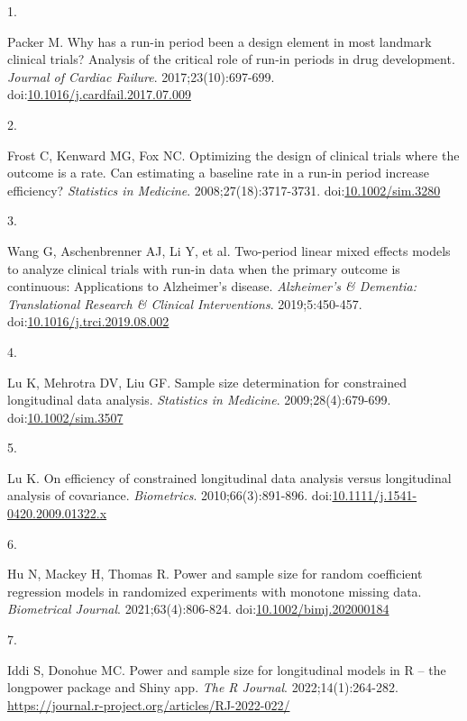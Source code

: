 \documentclass[
  11pt,
]{article}
\newlength{\cslhangindent}
\newlength{\csllabelwidth}
\newenvironment{CSLReferences}[2] %
 {\begin{list}{}{%
  \setlength{\itemindent}{0pt}
  \setlength{\leftmargin}{0pt}
  \setlength{\parsep}{0pt}
  \ifodd #1
   \setlength{\leftmargin}{\cslhangindent}
   \setlength{\itemindent}{-1\cslhangindent}
  \fi
  \setlength{\itemsep}{#2\baselineskip}}}
 {\end{list}}
\newcommand{\CSLLeftMargin}[1]{\parbox[t]{\csllabelwidth}{\strut#1\strut}}
\newcommand{\CSLRightInline}[1]{\parbox[t]{\linewidth - \csllabelwidth}{\strut#1\strut}}
\begin{document}
\protect{}\label{refs}
\begin{CSLReferences}{0}{1}
\CSLLeftMargin{1. }%
\CSLRightInline{Packer M. Why has a run-in period been a design element in most landmark clinical trials? {Analysis} of the critical role of run-in periods in drug development. \emph{Journal of Cardiac Failure}. 2017;23(10):697-699. doi:\href{https://doi.org/10.1016/j.cardfail.2017.07.009}{10.1016/j.cardfail.2017.07.009}}

\CSLLeftMargin{2. }%
\CSLRightInline{Frost C, Kenward MG, Fox NC. Optimizing the design of clinical trials where the outcome is a rate. {Can} estimating a baseline rate in a run-in period increase efficiency? \emph{Statistics in Medicine}. 2008;27(18):3717-3731. doi:\href{https://doi.org/10.1002/sim.3280}{10.1002/sim.3280}}

\CSLLeftMargin{3. }%
\CSLRightInline{Wang G, Aschenbrenner AJ, Li Y, et al. Two-period linear mixed effects models to analyze clinical trials with run-in data when the primary outcome is continuous: {Applications} to {Alzheimer's} disease. \emph{Alzheimer's \& Dementia: Translational Research \& Clinical Interventions}. 2019;5:450-457. doi:\href{https://doi.org/10.1016/j.trci.2019.08.002}{10.1016/j.trci.2019.08.002}}

\CSLLeftMargin{4. }%
\CSLRightInline{Lu K, Mehrotra DV, Liu GF. Sample size determination for constrained longitudinal data analysis. \emph{Statistics in Medicine}. 2009;28(4):679-699. doi:\href{https://doi.org/10.1002/sim.3507}{10.1002/sim.3507}}

\CSLLeftMargin{5. }%
\CSLRightInline{Lu K. On efficiency of constrained longitudinal data analysis versus longitudinal analysis of covariance. \emph{Biometrics}. 2010;66(3):891-896. doi:\href{https://doi.org/10.1111/j.1541-0420.2009.01322.x}{10.1111/j.1541-0420.2009.01322.x}}

\CSLLeftMargin{6. }%
\CSLRightInline{Hu N, Mackey H, Thomas R. Power and sample size for random coefficient regression models in randomized experiments with monotone missing data. \emph{Biometrical Journal}. 2021;63(4):806-824. doi:\href{https://doi.org/10.1002/bimj.202000184}{10.1002/bimj.202000184}}

\CSLLeftMargin{7. }%
\CSLRightInline{Iddi S, Donohue MC. Power and sample size for longitudinal models in {R} -- the longpower package and {Shiny} app. \emph{The R Journal}. 2022;14(1):264-282. \url{https://journal.r-project.org/articles/RJ-2022-022/}}


\end{CSLReferences}
\end{document}
